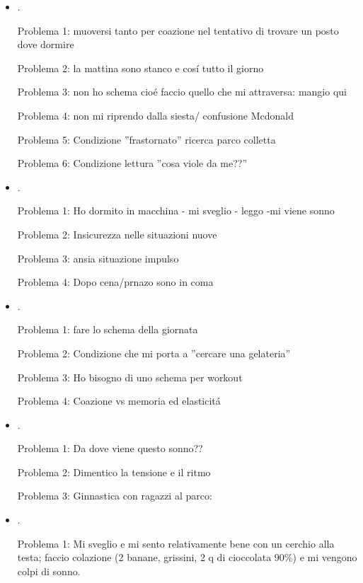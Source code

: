 \begin{itemize}
\item {}.

Problema 1: muoversi tanto per coazione nel tentativo di trovare un posto dove dormire

Problema 2: la mattina sono stanco e cos\'i tutto il giorno

Problema 3: non ho schema cio\'e faccio quello che mi attraversa: mangio qui

Problema 4: non mi riprendo dalla siesta/ confusione Mcdonald

Problema 5: Condizione ''frastornato'' ricerca parco colletta

Problema 6: Condizione lettura ''cosa viole da me??''

\item {}.

Problema 1: Ho dormito in macchina - mi sveglio - leggo -mi viene sonno

Problema 2: Insicurezza nelle situazioni nuove

Problema 3: ansia situazione impulso

Problema 4: Dopo cena/prnazo sono in coma

\item {}.

Problema 1: fare lo schema della giornata

Problema 2: Condizione che mi porta a ''cercare una gelateria''

Problema 3: Ho bisogno di uno schema per workout

Problema 4: Coazione vs memoria ed elasticit\'a

\item {}.

Problema 1: Da dove viene questo sonno??

Problema 2: Dimentico la tensione e  il ritmo

Problema 3: Ginnastica con ragazzi al parco: 

\item {}.

Problema 1: Mi sveglio e mi sento relativamente bene con un cerchio alla testa; faccio colazione (2 banane, grissini, 2 q di cioccolata 90\%) e mi vengono colpi di sonno.


\end{itemize}

